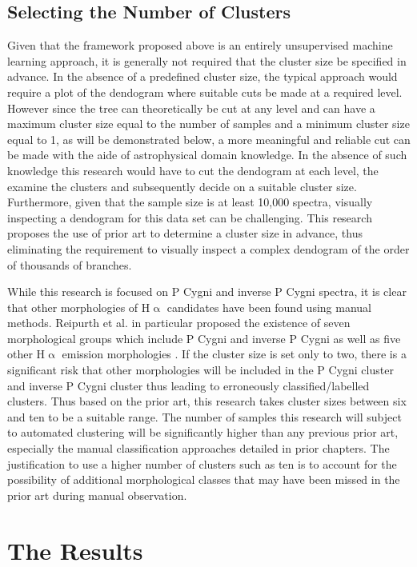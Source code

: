 \subsection{Selecting the Number of Clusters}

Given that the framework proposed above is an entirely unsupervised machine learning approach, it is generally not required that the cluster size be specified in advance. In the absence of a predefined cluster size, the typical approach would require a plot of the dendogram where suitable cuts be made at a required level. However since the tree can theoretically be cut at any level and can have a maximum cluster size equal to the number of samples and a minimum cluster size equal to 1, as will be demonstrated below, a more meaningful and reliable cut can be made with the aide of astrophysical domain knowledge. In the absence of such knowledge this research would have to cut the dendogram at each level, the examine the clusters and subsequently decide on a suitable cluster size. Furthermore, given that the sample size is at least 10,000 spectra, visually inspecting a dendogram for this data set can be challenging. This research proposes the use of prior art to determine a cluster size in advance, thus eliminating the requirement to visually inspect a complex dendogram of the order of thousands of branches. 

While this research is focused on P Cygni and inverse P Cygni spectra, it is clear that other morphologies of H$\upalpha$ candidates have been found using manual methods. Reipurth et al. in particular proposed the existence of seven morphological groups which include P Cygni and inverse P Cygni as well as five other H$\upalpha$ emission morphologies \cite{reipurth1996hupalpha}. If the cluster size is set only to two, there is a significant risk that other morphologies will be included in the P Cygni cluster and inverse P Cygni cluster thus leading to erroneously classified/labelled clusters. Thus based on the prior art, this research takes cluster sizes between six and ten to be a suitable range. The number of samples this research will subject to automated clustering will be significantly higher than any previous prior art, especially the manual classification approaches detailed in prior chapters. The justification to use a higher number of clusters such as ten is to account for the possibility of additional morphological classes that may have been missed in the prior art during manual observation. 

\section{The Results}

